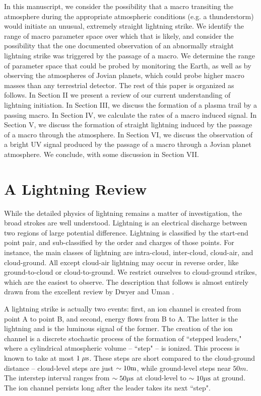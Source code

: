 \documentclass[%
 reprint,
 amsmath,amssymb,
 aps,
]{revtex4-2}
\begin{document}
    In this manuscript, we consider the possibility that a macro transiting the atmosphere during the appropriate atmospheric conditions (e.g. a thunderstorm) would initiate an unusual, extremely straight lightning strike. We identify the range of macro parameter space over which that is likely, and consider the possibility that the one documented observation of an abnormally straight lightning strike was triggered by the passage of a macro.  We determine the range of parameter space that could be probed by monitoring the Earth, as well as by observing the atmospheres of Jovian planets, which could probe higher macro masses than any terrestrial detector. The rest of this paper is organized as follows. In Section II we present a review of our current understanding of lightning initiation. In Section III, we discuss the formation of a plasma trail by a passing macro. In Section IV, we calculate the rates of a macro induced signal. In Section V, we discuss the formation of straight lightning induced by the passage of a macro through the atmosphere. In Section VI, we discuss the observation of a bright UV signal produced by the passage of a macro through a Jovian planet atmosphere. We conclude, with some discussion in Section VII.
    


\section{A Lightning Review} %
\label{sec:a_lightning_review}

    While the detailed physics of lightning remains a matter of investigation, the broad strokes are well understood. Lightning is an electrical discharge between two regions of large potential difference. Lightning is classified by the start-end point pair, and sub-classified by the order and charges of those points. For instance, the main classes of lightning are intra-cloud, inter-cloud, cloud-air, and cloud-ground. All except cloud-air lightning may occur in reverse order, like ground-to-cloud or cloud-to-ground. We restrict ourselves to cloud-ground strikes, which are the easiest to observe. The description that follows is almost entirely drawn from the excellent review by Dwyer and Uman \citep{DwyerUman2014}.

    A lightning strike is actually two events: first, an ion channel is created from point A to point B, and second, energy flows from B to A. The latter is the lightning and is the luminous signal of the former.  The creation of the ion channel is a discrete stochastic process of the formation of ``stepped leaders," where a cylindrical atmospheric volume -- ``step" -- is ionized. This process is known to take at most $1 \; \mu\rm{s}$. These steps are  short compared to the cloud-ground distance -- cloud-level steps  are just $\sim10 \rm{m}$, while ground-level steps near $50 m$. The interstep interval ranges from  $\sim50 \mu\rm{s}$ at cloud-level to $\sim10 \mu\rm{s}$ at ground. The ion channel persists long after the leader takes its next ``step". 
\end{document}
